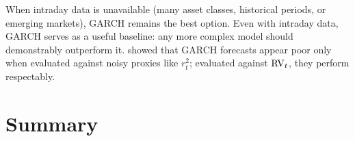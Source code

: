 \begin{warning}
When intraday data is unavailable (many asset classes, historical periods, or
emerging markets), GARCH remains the best option. Even with intraday data, GARCH
serves as a useful baseline: any more complex model should demonstrably outperform
it. \citet{andersen1998} showed that GARCH forecasts appear poor only when evaluated
against noisy proxies like $r^2_t$; evaluated against $\operatorname{RV}_t$, they perform
respectably.
\end{warning}


\section{Summary}
\label{sec:garch-summary}

